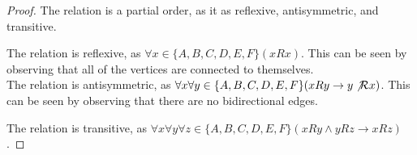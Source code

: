\documentclass[article, 12pt]{article}
\theoremstyle{definition}
\newcommand{\rel}{\mathcal{R}} %
\begin{document}
    \begin{proof}
        The relation is a partial order, as it as reflexive, antisymmetric, and transitive. 

        The relation is reflexive, as $\forall x \in \{A, B, C, D, E, F\}(xRx)$. This can be seen by observing that all of the vertices are connected to themselves.
        \\[12pt]
        The relation is antisymmetric, as $\forall x \forall y \in \{A, B, C, D, E, F\}(xRy \to y \not \rel x)$. This can be seen by observing that there are no bidirectional edges.

        The relation is transitive, as $\forall x \forall y \forall z \in \{A, B, C, D, E, F\}(xRy \land yRz \to xRz)$. 
    \end{proof}
    \begin{figure}[H]
        \centering
    \end{figure}
\end{document}
